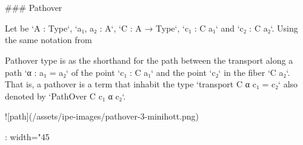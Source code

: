 {\begin{code}
\AgdaSpace{}%
\AgdaSymbol{)}\<%
\\
%
\>[4]\AgdaSpace{}%
\AgdaSpace{}%
\AgdaSpace{}%
\AgdaSpace{}%
\AgdaSpace{}%
\AgdaSpace{}%
\AgdaSpace{}%
\AgdaSpace{}%
\AgdaSymbol{(}\AgdaSpace{}%
\AgdaSpace{}%
\AgdaSpace{}%
\AgdaSymbol{)}\AgdaSpace{}%
\AgdaSpace{}%
\AgdaSpace{}%
\AgdaSpace{}%
\AgdaSpace{}%
\AgdaSymbol{(}\AgdaSpace{}%
\AgdaSpace{}%
\AgdaSpace{}%
\AgdaSpace{}%
\AgdaSymbol{)}\<%
\\
\>[0]\AgdaSpace{}%
\AgdaSpace{}%
\AgdaSpace{}%
\AgdaSpace{}%
\AgdaSpace{}%
\AgdaSpace{}%
\AgdaSpace{}%
\AgdaSymbol{=}\AgdaSpace{}%
\<%
\end{code}

### Pathover

Let be `A : Type`, `a₁, a₂ : A`, `C : A → Type`, `c₁ : C a₁` and `c₂ : C a₂`.
Using the same notation from {%
Pathover type is as the shorthand for the path between the transport along a
path `α : a₁ = a₂` of the point `c₁ : C a₁` and the point `c₂` in the fiber `C
a₂`. That is, a pathover is a term that inhabit the type `transport C α c₁ = c₂`
also denoted by `PathOver C c₁ α c₂`.

![path](/assets/ipe-images/pathover-3-minihott.png){: width="45%

}}}
